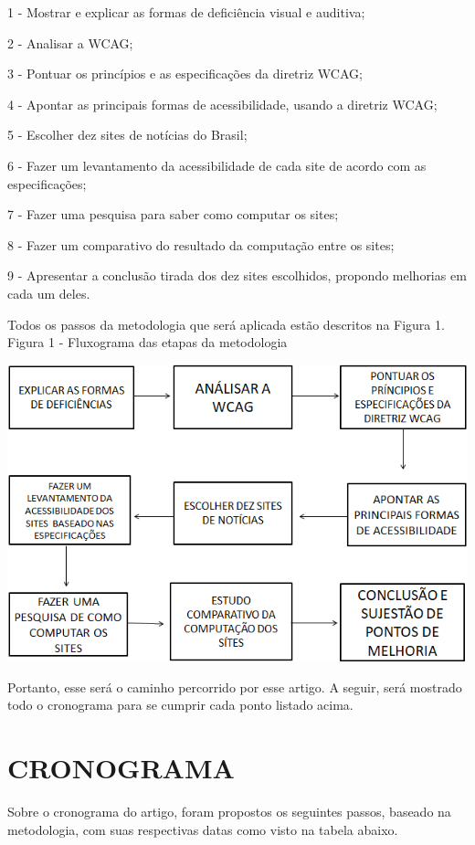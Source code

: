 \documentclass[a4paper]{article}
\begin{document}
\begin{titlepage}
1 - Mostrar e explicar as formas de deficiência visual e auditiva;

2 - Analisar a WCAG;

3 - Pontuar os princípios e as especificações da diretriz WCAG;

4 - Apontar as principais formas de acessibilidade, usando a diretriz WCAG;

5 - Escolher dez sites de notícias do Brasil;

6 - Fazer um levantamento da acessibilidade de cada site de acordo com as especificações;

7 - Fazer uma pesquisa para saber como computar os sites;

8 - Fazer um comparativo do resultado da computação entre os sites;

9 - Apresentar a conclusão tirada dos dez sites escolhidos, propondo melhorias em cada um deles.

Todos os passos da metodologia que será aplicada estão descritos na Figura 1.\\

Figura 1 - Fluxograma das etapas da metodologia\\[-0.7cm]
\begin{center}
	\parbox{10cm}{\includegraphics[scale=0.6]{Fluxograma - Metodologia TCC.png}}
\end{center}

Portanto, esse será o caminho percorrido por esse artigo. A seguir, será mostrado todo o cronograma para se cumprir cada ponto listado acima.

\section{CRONOGRAMA}
Sobre o cronograma do artigo, foram propostos os seguintes passos, baseado na metodologia, com suas respectivas datas como visto na tabela abaixo.


\end{titlepage}
\end{document}

